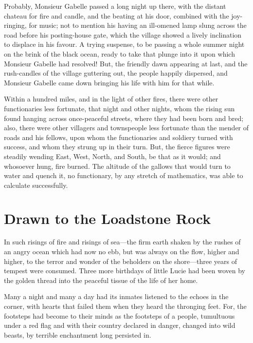 Probably, Monsieur Gabelle passed a long night up there, with the
distant chateau for fire and candle, and the beating at his door,
combined with the joy-ringing, for music; not to mention his having
an ill-omened lamp slung across the road before his posting-house gate,
which the village showed a lively inclination to displace in his favour.
A trying suspense, to be passing a whole summer night on the brink of
the black ocean, ready to take that plunge into it upon which Monsieur
Gabelle had resolved!  But, the friendly dawn appearing at last, and
the rush-candles of the village guttering out, the people happily
dispersed, and Monsieur Gabelle came down bringing his life with him
for that while.

Within a hundred miles, and in the light of other fires, there were
other functionaries less fortunate, that night and other nights, whom
the rising sun found hanging across once-peaceful streets, where they
had been born and bred; also, there were other villagers and townspeople
less fortunate than the mender of roads and his fellows, upon whom
the functionaries and soldiery turned with success, and whom they
strung up in their turn.  But, the fierce figures were steadily wending
East, West, North, and South, be that as it would; and whosoever hung,
fire burned.  The altitude of the gallows that would turn to water
and quench it, no functionary, by any stretch of mathematics, was
able to calculate successfully.



\chapter{Drawn to the Loadstone Rock}


In such risings of fire and risings of sea---the firm earth shaken by
the rushes of an angry ocean which had now no ebb, but was always on
the flow, higher and higher, to the terror and wonder of the beholders
on the shore---three years of tempest were consumed.  Three more
birthdays of little Lucie had been woven by the golden thread into
the peaceful tissue of the life of her home.

Many a night and many a day had its inmates listened to the echoes in
the corner, with hearts that failed them when they heard the thronging
feet.  For, the footsteps had become to their minds as the footsteps
of a people, tumultuous under a red flag and with their country declared
in danger, changed into wild beasts, by terrible enchantment long
persisted in.

